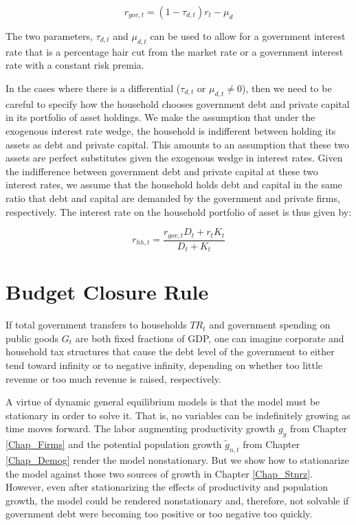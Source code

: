 \begin{equation}\label{EqUnbalGBC_rate_wedge}
  r_{gov, t} = (1 - \tau_{d, t})r_{t} - \mu_{d}
\end{equation}

The two parameters, $\tau_{d,t}$ and $\mu_{d,t}$ can be used to allow for a government interest rate that is a percentage hair cut from the market rate or a government interest rate with a constant risk premia.

In the cases where there is a differential ($\tau_{d,t}$ or $\mu_{d,t} \neq 0$), then we need to be careful to specify how the household chooses government debt and private capital in its portfolio of asset holdings.  We make the assumption that under the exogenous interest rate wedge, the household is indifferent between holding its assets as debt and private capital. This amounts to an assumption that these two assets are perfect substitutes given the exogenous wedge in interest rates.  Given the indifference between government debt and private capital at these two interest rates, we assume that the household holds debt and capital in the same ratio that debt and capital are demanded by the government and private firms, respectively. The interest rate on the household portfolio of asset is thus given by:

\begin{equation}\label{EqUnbalGBC_rate_wedge}
  r_{hh,t} = \frac{r_{gov,t}D_{t} + r_{t}K_{t}}{D_{t} + K_{t}}
\end{equation}



\section{Budget Closure Rule}\label{SecUnbalGBCcloseRule}

  If total government transfers to households $TR_t$ and government spending on public goods $G_t$ are both fixed fractions of GDP, one can imagine corporate and household tax structures that cause the debt level of the government to either tend toward infinity or to negative infinity, depending on whether too little revenue or too much revenue is raised, respectively.

  A virtue of dynamic general equilibrium models is that the model must be stationary in order to solve it. That is, no variables can be indefinitely growing as time moves forward. The labor augmenting productivity growth $g_y$ from Chapter \ref{Chap_Firms} and the potential population growth $\tilde{g}_{n,t}$ from Chapter \ref{Chap_Demog} render the model nonstationary. But we show how to stationarize the model against those two sources of growth in Chapter \ref{Chap_Stnrz}. However, even after stationarizing the effects of productivity and population growth, the model could be rendered nonstationary and, therefore, not solvable if government debt were becoming too positive or too negative too quickly.

